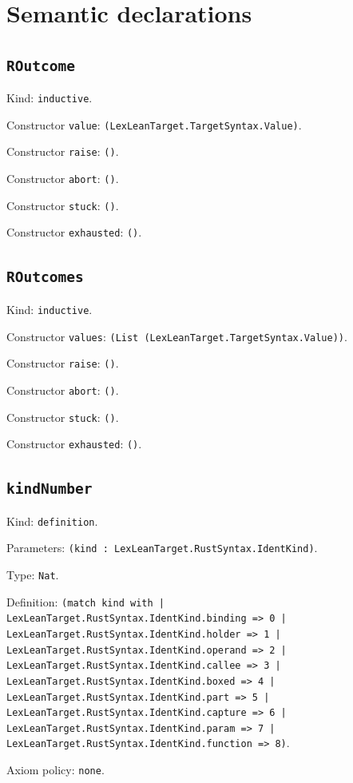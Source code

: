 \documentclass[11pt]{article}
\begin{document}
\section*{Semantic declarations}
\subsection*{\texttt{ROutcome}}
\noindent Kind: \texttt{inductive}.\par
\noindent Constructor \texttt{value}: \texttt{(LexLeanTarget.TargetSyntax.Value)}.\par
\noindent Constructor \texttt{raise}: \texttt{()}.\par
\noindent Constructor \texttt{abort}: \texttt{()}.\par
\noindent Constructor \texttt{stuck}: \texttt{()}.\par
\noindent Constructor \texttt{exhausted}: \texttt{()}.\par
\subsection*{\texttt{ROutcomes}}
\noindent Kind: \texttt{inductive}.\par
\noindent Constructor \texttt{values}: \texttt{(List (LexLeanTarget.TargetSyntax.Value))}.\par
\noindent Constructor \texttt{raise}: \texttt{()}.\par
\noindent Constructor \texttt{abort}: \texttt{()}.\par
\noindent Constructor \texttt{stuck}: \texttt{()}.\par
\noindent Constructor \texttt{exhausted}: \texttt{()}.\par
\subsection*{\texttt{kindNumber}}
\noindent Kind: \texttt{definition}.\par
\noindent Parameters: \texttt{(kind : LexLeanTarget.RustSyntax.IdentKind)}.\par
\noindent Type: \texttt{Nat}.\par
\noindent Definition: \texttt{(match kind with | LexLeanTarget.RustSyntax.IdentKind.binding => 0 | LexLeanTarget.RustSyntax.IdentKind.holder => 1 | LexLeanTarget.RustSyntax.IdentKind.operand => 2 | LexLeanTarget.RustSyntax.IdentKind.callee => 3 | LexLeanTarget.RustSyntax.IdentKind.boxed => 4 | LexLeanTarget.RustSyntax.IdentKind.part => 5 | LexLeanTarget.RustSyntax.IdentKind.capture => 6 | LexLeanTarget.RustSyntax.IdentKind.param => 7 | LexLeanTarget.RustSyntax.IdentKind.function => 8)}.\par
\noindent Axiom policy: \texttt{none}.\par
\end{document}

